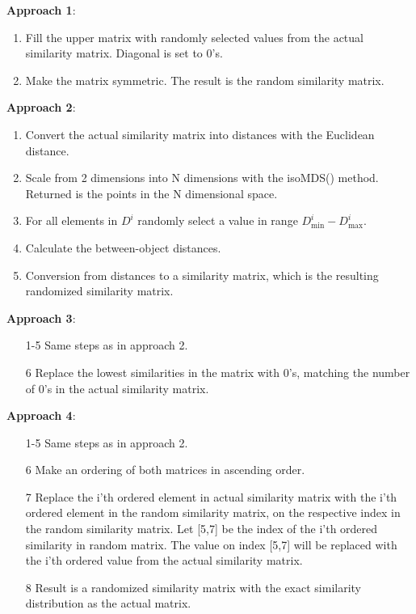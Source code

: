 \documentclass[a4paper,10pt]{article}
\theoremstyle{plain}
\theoremstyle{definition}
\begin{document}
\textbf{Approach 1}:
\begin{enumerate}
	\item Fill the upper matrix with randomly selected values from the actual similarity matrix. Diagonal is set to 0's.
	\item Make the matrix symmetric. The result is the random similarity matrix.
\end{enumerate}

\textbf{Approach 2}:
\begin{enumerate}
	\item Convert the actual similarity matrix into distances with the Euclidean distance.
	\item Scale from 2 dimensions into N dimensions with the isoMDS() method. Returned is the points in the N dimensional space.
	\item For all elements in $D^i$ randomly select a value in range $D_{\min}^{i} - D_{\max}^{i}$.
	\item Calculate the between-object distances.
	\item Conversion from distances to a similarity matrix, which is the resulting randomized similarity matrix.
\end{enumerate}

\textbf{Approach 3}:
\begin{enumerate}
	\item [1-5] Same steps as in approach 2.
	\item [6] Replace the lowest similarities in the matrix with 0's, matching the number of 0's in the actual similarity matrix.
\end{enumerate}

\textbf{Approach 4}:
\begin{enumerate}
	\item [1-5] Same steps as in approach 2.
	\item [6] Make an ordering of both matrices in ascending order.
	\item [7] Replace the i'th ordered element in actual similarity matrix with the i'th ordered element in the random similarity matrix, on the respective index in the random similarity matrix. Let [5,7] be the index of the i'th ordered similarity in random matrix. The value on index [5,7] will be replaced with the i'th ordered value from the actual similarity matrix.
	\item [8] Result is a randomized similarity matrix with the exact similarity distribution as the actual matrix.
\end{enumerate}
\end{document}
